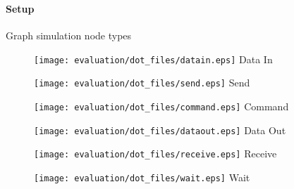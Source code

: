 \begin{frame}[fragile]
    \frametitle{\EvaluationTitle}
    \framesubtitle{Setup}
    Graph simulation node types
    \begin{figure}
        \centering
        \begin{minipage}{0.16\textwidth}
            \centering
            \texttt{[image: evaluation/dot\_files/datain.eps]}
            Data In
            \label{fig:packet_graph_datain}
        \end{minipage}%
        \begin{minipage}{0.16\textwidth}
            \centering
            \texttt{[image: evaluation/dot\_files/send.eps]}
            Send
            \label{fig:packet_graph_send}
        \end{minipage}%
        \begin{minipage}{0.16\textwidth}
            \centering
            \texttt{[image: evaluation/dot\_files/command.eps]}
            Command
            \label{fig:packet_graph_command}
        \end{minipage}%
        \begin{minipage}{0.16\textwidth}
            \centering
            \texttt{[image: evaluation/dot\_files/dataout.eps]}
            Data Out
            \label{fig:packet_graph_dataout}
        \end{minipage}%
        \begin{minipage}{0.16\textwidth}
            \centering
            \texttt{[image: evaluation/dot\_files/receive.eps]}
            Receive
            \label{fig:packet_graph_receive}
        \end{minipage}%
        \begin{minipage}{0.16\textwidth}
            \centering
            \texttt{[image: evaluation/dot\_files/wait.eps]}
            Wait
            \label{fig:packet_graph_wait}
        \end{minipage}%
    \end{figure}%
\end{frame}